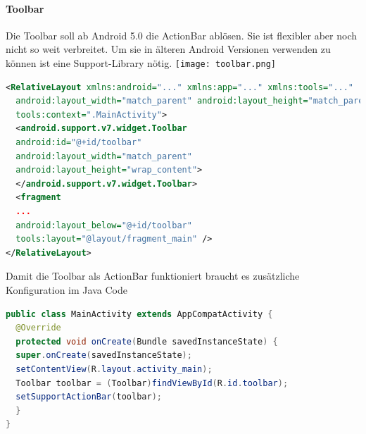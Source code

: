 \paragraph{Toolbar} Die Toolbar soll ab Android 5.0 die ActionBar ablösen. Sie ist flexibler aber noch nicht so weit verbreitet. Um sie in älteren Android Versionen verwenden zu können ist eine Support-Library nötig.
\texttt{[image: toolbar.png]}
\begin{lstlisting}[language=xml]
<RelativeLayout xmlns:android="..." xmlns:app="..." xmlns:tools="..."
  android:layout_width="match_parent" android:layout_height="match_parent"
  tools:context=".MainActivity">
  <android.support.v7.widget.Toolbar
  android:id="@+id/toolbar"
  android:layout_width="match_parent"
  android:layout_height="wrap_content">
  </android.support.v7.widget.Toolbar>
  <fragment
  ...
  android:layout_below="@+id/toolbar"
  tools:layout="@layout/fragment_main" />
</RelativeLayout>
\end{lstlisting}
Damit die Toolbar als ActionBar funktioniert braucht es zusätzliche Konfiguration im Java Code
\begin{lstlisting}[language=java]
public class MainActivity extends AppCompatActivity {
  @Override
  protected void onCreate(Bundle savedInstanceState) {
  super.onCreate(savedInstanceState);
  setContentView(R.layout.activity_main);
  Toolbar toolbar = (Toolbar)findViewById(R.id.toolbar);
  setSupportActionBar(toolbar);
  }
}
\end{lstlisting}
